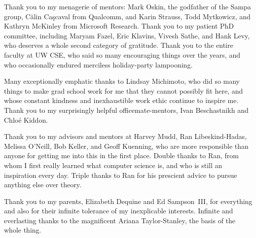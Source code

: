 Thank you to my menagerie of mentors:
Mark Oskin, the godfather of the Sampa group,
Călin Caşcaval from Qualcomm,
and
Karin Strauss, Todd Mytkowicz, and Kathryn McKinley from Microsoft Research.
Thank you to my patient PhD committee, including
Maryam Fazel, Eric Klavins, Vivesh Sathe, and Hank Levy, who deserves a whole
second category of gratitude.
Thank you to the entire faculty at UW CSE, who said so many encouraging things
over the years, and who occasionally endured merciless holiday-party
lampooning.

Many exceptionally emphatic thanks to Lindsay Michimoto, who did so many
things to make grad school work for me that they cannot possibly fit here, and
whose constant kindness and inexhaustible work ethic continue to inspire me.
Thank you to my surprisingly helpful officemate-mentors, Ivan Beschastnikh and
Chloé Kiddon.

Thank you to my advisors and mentors at Harvey Mudd,
Ran Libeskind-Hadas,
Melissa O'Neill,
Bob Keller,
and Geoff Kuenning,
who are more responsible than anyone for getting me into this in the first
place.
Double thanks to Ran, from whom I first really learned what computer science
is, and who is still an inspiration every day.
Triple thanks to Ran for his prescient advice to pursue anything else over
theory.

Thank you to my parents, Elizabeth Dequine and Ed Sampson~III, for everything
and also for their infinite tolerance of my inexplicable interests.
Infinite and everlasting thanks to the magnificent Ariana Taylor-Stanley, the
basis of the whole thing.

